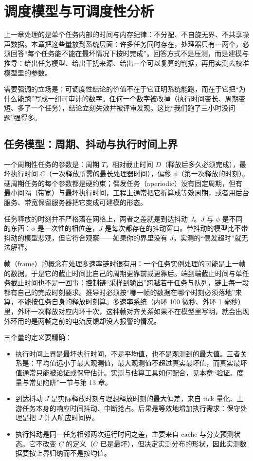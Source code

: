 \documentclass[12pt,a4paper,fontset=fandol]{ctexbook}
\begin{document}
\chapter{调度模型与可调度性分析}
\label{ch:ch10-schedulability}

上一章处理的是单个任务内部的时间与内存纪律：不分配、不自旋无界、不共享噪声数据。本章把这些量放到系统层面：许多任务同时存在，处理器只有一两个，必须回答“每个任务能不能在最坏情况下按时完成”。回答方式不是压测，而是建模与推导：给出任务模型、给出干扰来源、给出一个可以复算的判据，再用实测去校准模型里的参数。

需要强调的立场是：可调度性结论的价值不在于它证明系统能跑，而在于它把“为什么能跑”写成一组可审计的数字。任何一个数字被改掉（执行时间变长、周期变短、多了一个任务），结论立刻失效并被评审发现。这比“我们跑了三小时没问题”强得多。

\section{任务模型：周期、抖动与执行时间上界}

一个周期性任务的参数是：周期 $T$，相对截止时间 $D$（释放后多久必须完成），最坏执行时间 $C$（一次释放所需的最长处理器时间），偏移 $\phi$（第一次释放的时刻）。硬周期任务的每个参数都是硬约束；偶发任务（aperiodic）没有固定周期，但有最小间隔（带宽）与最坏执行时间，工程上通常把它折算成等效周期，或者用后台服务、带宽保留服务器把它变成可建模的形态。

任务释放的时刻并不严格落在网格上，两者之差就是到达抖动 $J$。$J$ 与 $\phi$ 是不同的东西：$\phi$ 是一次性的相位差，$J$ 是每次都存在的抖动窗口。带抖动的模型比不带抖动的模型悲观，但它符合观察——如果你的界里没有 $J$，实测的“偶发超时”就无法解释。

帧（frame）的概念在处理多速率链时很有用：一个任务实例处理的可能是上一帧的数据，于是它的截止时间比自己的周期更靠前或更靠后。端到端截止时间与单任务截止时间也不是一回事：控制链“采样到输出”跨越若干任务与队列，链上每一段都有自己的完成时刻要求。推导时必须按“哪一帧的数据在哪个时刻必须落地”来算，不能按任务自身的释放时刻算。多速率系统（内环 100 微秒、外环 1 毫秒）里，外环一次释放对应内环十次，这种帧对齐关系如果不在模型里写明，就会出现外环用的是两帧之前的电流反馈却没人报警的情况。

三个量的定义要精确：

\begin{itemize}
\item 执行时间上界是最坏执行时间，不是平均值，也不是观测到的最大值。三者关系是：平均值远小于最大观测值，最大观测值不超过真实最坏值，而真实最坏值通常只能被论证或保守估计。实测与估算工具如何配合，见本章“验证、度量与常见陷阱”一节与第 13 章。
\item 到达抖动 $J$ 是实际释放时刻与理想释放时刻的最大偏差，来自 tick 量化、上游任务本身的响应时间抖动、中断抢占。后果是等效地增加执行需求：保守处理是把 $J$ 计入响应时间界。
\item 执行抖动是同一任务相邻两次运行时间之差，主要来自 cache 与分支预测状态。它不改变 $C$ 的定义（$C$ 已是最坏），但决定实测分布的形状，因此实测数据要按上界归纳而不是按均值。
\end{itemize}
\end{document}
